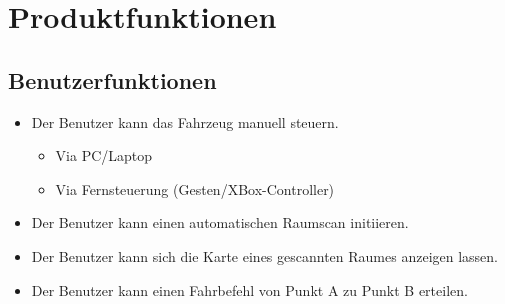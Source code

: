 \section{Produktfunktionen}

\subsection{Benutzerfunktionen}

\begin{itemize}
  \item Der Benutzer kann das Fahrzeug manuell steuern.
	  \begin{itemize}
		\item Via PC/Laptop
		\item Via Fernsteuerung (Gesten/XBox-Controller)
	  \end{itemize}
  \item Der Benutzer kann einen automatischen Raumscan initiieren.
  \item Der Benutzer kann sich die Karte eines gescannten Raumes anzeigen lassen.
  \item Der Benutzer kann einen Fahrbefehl von Punkt A zu Punkt B erteilen.
\end{itemize}

